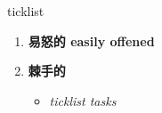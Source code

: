 
\begin{frame}
{\huge ticklist}
\begin{center}
\begin{enumerate}\Large
  \item \textbf{易怒的 easily offened}
  \item \textbf{棘手的}
  \begin{itemize}
    \item \em{\Large{ticklist tasks}}
  \end{itemize}
\end{enumerate}
\end{center}
\end{frame}
